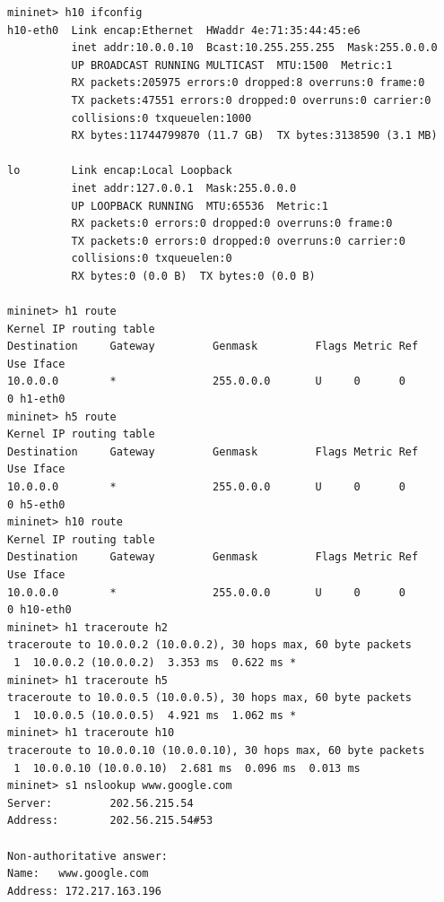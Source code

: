 \documentclass[a4paper, 11pt]{article}
\begin{document}
\begin{appendices}
\begin{lstlisting}[style=BashInputStyle]
mininet> h10 ifconfig
h10-eth0  Link encap:Ethernet  HWaddr 4e:71:35:44:45:e6
          inet addr:10.0.0.10  Bcast:10.255.255.255  Mask:255.0.0.0
          UP BROADCAST RUNNING MULTICAST  MTU:1500  Metric:1
          RX packets:205975 errors:0 dropped:8 overruns:0 frame:0
          TX packets:47551 errors:0 dropped:0 overruns:0 carrier:0
          collisions:0 txqueuelen:1000
          RX bytes:11744799870 (11.7 GB)  TX bytes:3138590 (3.1 MB)

lo        Link encap:Local Loopback
          inet addr:127.0.0.1  Mask:255.0.0.0
          UP LOOPBACK RUNNING  MTU:65536  Metric:1
          RX packets:0 errors:0 dropped:0 overruns:0 frame:0
          TX packets:0 errors:0 dropped:0 overruns:0 carrier:0
          collisions:0 txqueuelen:0
          RX bytes:0 (0.0 B)  TX bytes:0 (0.0 B)

mininet> h1 route
Kernel IP routing table
Destination     Gateway         Genmask         Flags Metric Ref    Use Iface
10.0.0.0        *               255.0.0.0       U     0      0        0 h1-eth0
mininet> h5 route
Kernel IP routing table
Destination     Gateway         Genmask         Flags Metric Ref    Use Iface
10.0.0.0        *               255.0.0.0       U     0      0        0 h5-eth0
mininet> h10 route
Kernel IP routing table
Destination     Gateway         Genmask         Flags Metric Ref    Use Iface
10.0.0.0        *               255.0.0.0       U     0      0        0 h10-eth0
mininet> h1 traceroute h2
traceroute to 10.0.0.2 (10.0.0.2), 30 hops max, 60 byte packets
 1  10.0.0.2 (10.0.0.2)  3.353 ms  0.622 ms *
mininet> h1 traceroute h5
traceroute to 10.0.0.5 (10.0.0.5), 30 hops max, 60 byte packets
 1  10.0.0.5 (10.0.0.5)  4.921 ms  1.062 ms *
mininet> h1 traceroute h10
traceroute to 10.0.0.10 (10.0.0.10), 30 hops max, 60 byte packets
 1  10.0.0.10 (10.0.0.10)  2.681 ms  0.096 ms  0.013 ms
mininet> s1 nslookup www.google.com
Server:         202.56.215.54
Address:        202.56.215.54#53

Non-authoritative answer:
Name:   www.google.com
Address: 172.217.163.196
\end{lstlisting}


\end{appendices}
\end{document}
